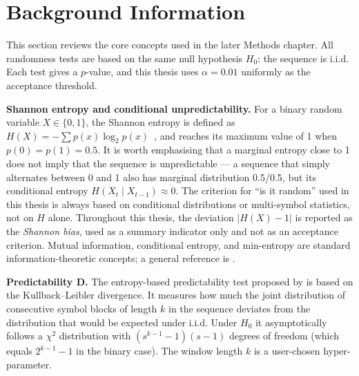 \documentclass[11pt,titlepage,openany,oneside]{book}  %
\begin{document}
\section{Background Information}
\label{sec:background-information}

This section reviews the core concepts used in the later Methods chapter. All randomness tests are based on the same null hypothesis $H_0$: the sequence is i.i.d. Each test gives a $p$-value, and this thesis uses $\alpha = 0.01$ uniformly as the acceptance threshold.

\textbf{Shannon entropy and conditional unpredictability.} For a binary random variable $X \in \{0, 1\}$, the Shannon entropy is defined as $H(X) = -\sum p(x) \log_2 p(x)$~\citep{shannon1948communication}, and reaches its maximum value of 1 when $p(0) = p(1) = 0.5$. It is worth emphasising that a marginal entropy close to 1 does not imply that the sequence is unpredictable --- a sequence that simply alternates between 0 and 1 also has marginal distribution 0.5/0.5, but its conditional entropy $H(X_t \mid X_{t-1}) \approx 0$. The criterion for ``is it random'' used in this thesis is always based on conditional distributions or multi-symbol statistics, not on $H$ alone. Throughout this thesis, the deviation $|H(X) - 1|$ is reported as the \emph{Shannon bias}, used as a summary indicator only and not as an acceptance criterion. Mutual information, conditional entropy, and min-entropy are standard information-theoretic concepts; a general reference is \citet{cover2006information}.

\textbf{Predictability $\boldsymbol{D}$.} The entropy-based predictability test proposed by \citet{shternshis2025predictability} is based on the Kullback--Leibler divergence. It measures how much the joint distribution of consecutive symbol blocks of length $k$ in the sequence deviates from the distribution that would be expected under i.i.d. Under $H_0$ it asymptotically follows a $\chi^2$ distribution with $(s^{k-1} - 1)(s - 1)$ degrees of freedom (which equals $2^{k-1} - 1$ in the binary case). The window length $k$ is a user-chosen hyper-parameter.
\end{document}
